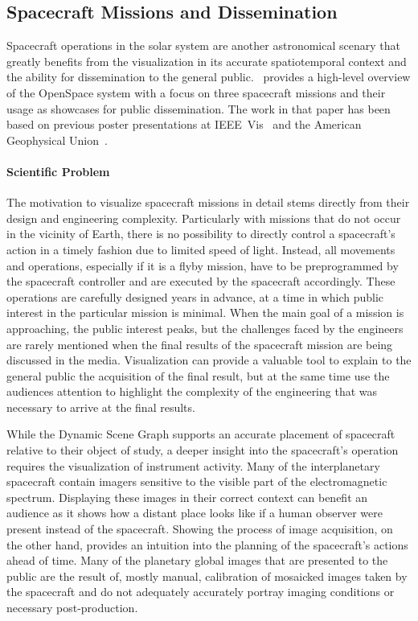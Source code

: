 \subsection{Spacecraft Missions and Dissemination} \label{contributions:astro:sc}
Spacecraft operations in the solar system are another astronomical scenary that greatly benefits from the visualization in its accurate spatiotemporal context and the ability for dissemination to the general public.  \paperOS\ provides a high-level overview of the OpenSpace system with a focus on three spacecraft missions and their usage as showcases for public dissemination.  The work in that paper has been based on previous poster presentations at IEEE~Vis~\cite{bock15openspace} and the American Geophysical Union~\cite{bock15bopenspace}.

\paragraph{Scientific Problem} \label{contributions:astro:gb:problem}
The motivation to visualize spacecraft missions in detail stems directly from their design and engineering complexity.  Particularly with missions that do not occur in the vicinity of Earth, there is no possibility to directly control a spacecraft's action in a timely fashion due to limited speed of light.  Instead, all movements and operations, especially if it is a flyby mission, have to be preprogrammed by the spacecraft controller and are executed by the spacecraft accordingly.  These operations are carefully designed years in advance, at a time in which public interest in the particular mission is minimal.  When the main goal of a mission is approaching, the public interest peaks, but the challenges faced by the engineers are rarely mentioned when the final results of the spacecraft mission are being discussed in the media.  Visualization can provide a valuable tool to explain to the general public the acquisition of the final result, but at the same time use the audiences attention to highlight the complexity of the engineering that was necessary to arrive at the final results.

While the Dynamic Scene Graph supports an accurate placement of spacecraft relative to their object of study, a deeper insight into the spacecraft's operation requires the visualization of instrument activity.  Many of the interplanetary spacecraft contain imagers sensitive to the visible part of the electromagnetic spectrum.  Displaying these images in their correct context can benefit an audience as it shows how a distant place looks like if a human observer were present instead of the spacecraft.  Showing the process of image acquisition, on the other hand, provides an intuition into the planning of the spacecraft's actions ahead of time.  Many of the planetary global images that are presented to the public are the result of, mostly manual, calibration of mosaicked images taken by the spacecraft and do not adequately accurately portray imaging conditions or necessary post-production.

